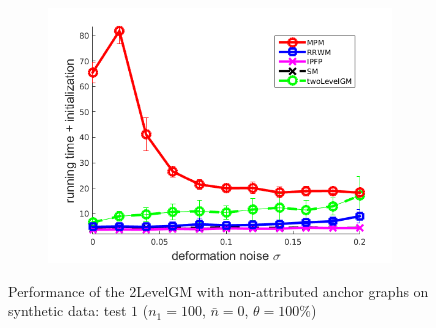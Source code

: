 \begin{figure}
\begin{subfigure}[b]{0.33\textwidth}
	\end{subfigure} 
	\begin{subfigure}[b]{0.32\textwidth}
		\centering
		\includegraphics[scale=0.25]{"chapter3/fig/SyntheticTest/no_descr/Results_v4.3.3/Test2/time_summary_avg10t"} 
	\end{subfigure} 
	\caption[Performance of the 2LevelGM with non-attributed anchor graphs on synthetic data (test $1$)]{Performance of the 2LevelGM with non-attributed anchor graphs on synthetic data: test $1$ ($n_1=100$, $\bar{n}=0$, $\theta=100\%$)}
	\label{fig:synTest1_ver433}
\end{figure}
